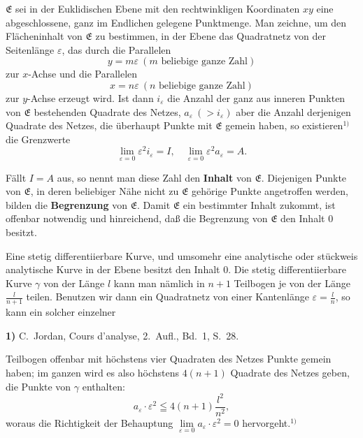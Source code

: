 \documentclass{article}
\begin{document}
$\mathfrak{E}$ sei in der Euklidischen Ebene mit den rechtwinkligen Koordinaten $xy$ eine abgeschlossene, ganz im Endlichen gelegene Punktmenge. Man zeichne, um den Flächeninhalt von $\mathfrak{E}$ zu bestimmen, in der Ebene das Quadratnetz von der Seitenlänge $\varepsilon$, das durch die Parallelen
\[ y = m\varepsilon \ (m \text{ beliebige ganze Zahl}) \]
zur $x$-Achse und die Parallelen
\[ x = n\varepsilon \ (n \text{ beliebige ganze Zahl}) \]
zur $y$-Achse erzeugt wird. Ist dann $i_\varepsilon$ die Anzahl der ganz aus inneren Punkten von $\mathfrak{E}$ bestehenden Quadrate des Netzes, $a_\varepsilon\ (> i_\varepsilon)$ aber die Anzahl derjenigen Quadrate des Netzes, die überhaupt Punkte mit $\mathfrak{E}$ gemein haben, so existieren${}^{1)}$ die Grenzwerte
\[ \lim_{\varepsilon=0} \varepsilon^2 i_\varepsilon = I, \quad \lim_{\varepsilon=0} \varepsilon^2 a_\varepsilon = A. \]

Fällt $I = A$ aus, so nennt man diese Zahl den \textbf{Inhalt} von $\mathfrak{E}$. Diejenigen Punkte von $\mathfrak{E}$, in deren beliebiger Nähe nicht zu $\mathfrak{E}$ gehörige Punkte angetroffen werden, bilden die \textbf{Begrenzung} von $\mathfrak{E}$. Damit $\mathfrak{E}$ ein bestimmter Inhalt zukommt, ist offenbar notwendig und hinreichend, daß die Begrenzung von $\mathfrak{E}$ den Inhalt $0$ besitzt.

Eine stetig differentiierbare Kurve, und umsomehr eine analytische oder stückweis analytische Kurve in der Ebene besitzt den Inhalt $0$. Die stetig differentiierbare Kurve $\gamma$ von der Länge $l$ kann man nämlich in $n + 1$ Teilbogen je von der Länge $\frac{l}{n + 1}$ teilen. Benutzen wir dann ein Quadratnetz von einer Kantenlänge $\varepsilon = \frac{l}{n}$, so kann ein solcher einzelner

\textbf{1)} C.~Jordan, Cours d'analyse, 2.~Aufl., Bd.~1, S.~28.

Teilbogen offenbar mit höchstens vier Quadraten des Netzes Punkte gemein haben; im ganzen wird es also höchstens $4(n + 1)$ Quadrate des Netzes geben, die Punkte von $\gamma$ enthalten:
\[ a_\varepsilon \cdot \varepsilon^2 \leqq 4(n + 1) \frac{l^2}{n^2}, \]
woraus die Richtigkeit der Behauptung $\lim\limits_{\varepsilon=0} a_\varepsilon \cdot \varepsilon^2 = 0$ hervorgeht.${}^{1)}$
\end{document}
